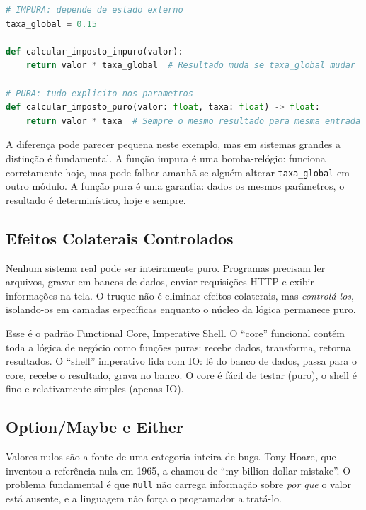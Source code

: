 \begin{lstlisting}[language=Python, caption={Funções puras vs impuras}]
# IMPURA: depende de estado externo
taxa_global = 0.15

def calcular_imposto_impuro(valor):
    return valor * taxa_global  # Resultado muda se taxa_global mudar

# PURA: tudo explicito nos parametros
def calcular_imposto_puro(valor: float, taxa: float) -> float:
    return valor * taxa  # Sempre o mesmo resultado para mesma entrada
\end{lstlisting}

A diferença pode parecer pequena neste exemplo, mas em sistemas grandes a
distinção é fundamental. A função impura é uma bomba-relógio: funciona
corretamente hoje, mas pode falhar amanhã se alguém alterar
\texttt{taxa\_global} em outro módulo. A função pura é uma garantia: dados
os mesmos parâmetros, o resultado é determinístico, hoje e sempre.

\subsection{Efeitos Colaterais Controlados}

Nenhum sistema real pode ser inteiramente puro. Programas precisam ler
arquivos, gravar em bancos de dados, enviar requisições HTTP e exibir
informações na tela. O truque não é eliminar efeitos colaterais, mas
\emph{controlá-los}, isolando-os em camadas específicas enquanto o
núcleo da lógica permanece puro.

Esse é o padrão Functional Core, Imperative Shell. O ``core'' funcional
contém toda a lógica de negócio como funções puras: recebe dados,
transforma, retorna resultados. O ``shell'' imperativo lida com IO: lê
do banco de dados, passa para o core, recebe o resultado, grava no banco.
O core é fácil de testar (puro), o shell é fino e relativamente simples
(apenas IO).

\subsection{Option/Maybe e Either}

Valores nulos são a fonte de uma categoria inteira de bugs. Tony Hoare,
que inventou a referência nula em 1965, a chamou de ``my billion-dollar
mistake''. O problema fundamental é que \texttt{null} não carrega
informação sobre \emph{por que} o valor está ausente, e a linguagem não
força o programador a tratá-lo.

